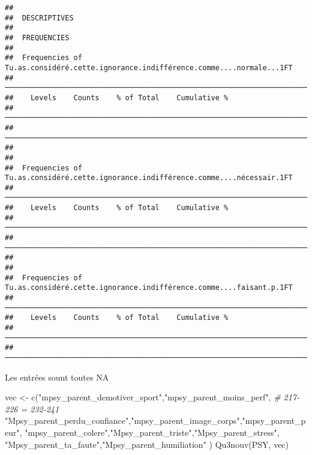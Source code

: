 \documentclass[
]{article}
\newenvironment{Shaded}{\begin{snugshade}}{\end{snugshade}}
\newcommand{\CommentTok}[1]{\textcolor[rgb]{0.56,0.35,0.01}{\textit{#1}}}
\newcommand{\FunctionTok}[1]{\textcolor[rgb]{0.00,0.00,0.00}{#1}}
\newcommand{\NormalTok}[1]{#1}
\newcommand{\OtherTok}[1]{\textcolor[rgb]{0.56,0.35,0.01}{#1}}
\newcommand{\StringTok}[1]{\textcolor[rgb]{0.31,0.60,0.02}{#1}}
\begin{document}
\begin{verbatim}
## 
##  DESCRIPTIVES
## 
##  FREQUENCIES
## 
##  Frequencies of Tu.as.considéré.cette.ignorance.indifférence.comme....normale...1FT 
##  ────────────────────────────────────────────────────────────────────────────────── 
##    Levels    Counts    % of Total    Cumulative %   
##  ────────────────────────────────────────────────────────────────────────────────── 
##  ────────────────────────────────────────────────────────────────────────────────── 
## 
## 
##  Frequencies of Tu.as.considéré.cette.ignorance.indifférence.comme....nécessair.1FT 
##  ────────────────────────────────────────────────────────────────────────────────── 
##    Levels    Counts    % of Total    Cumulative %   
##  ────────────────────────────────────────────────────────────────────────────────── 
##  ────────────────────────────────────────────────────────────────────────────────── 
## 
## 
##  Frequencies of Tu.as.considéré.cette.ignorance.indifférence.comme....faisant.p.1FT 
##  ────────────────────────────────────────────────────────────────────────────────── 
##    Levels    Counts    % of Total    Cumulative %   
##  ────────────────────────────────────────────────────────────────────────────────── 
##  ──────────────────────────────────────────────────────────────────────────────────
\end{verbatim}

Les entrées sount toutes NA

\begin{Shaded}
\begin{Highlighting}[]
\NormalTok{vec }\OtherTok{\textless{}{-}} \FunctionTok{c}\NormalTok{(}\StringTok{"mpsy\_parent\_demotiver\_sport"}\NormalTok{,}\StringTok{"mpsy\_parent\_moins\_perf"}\NormalTok{,         }\CommentTok{\# 217{-}226 = 232{-}241}
  \StringTok{"Mpsy\_parent\_perdu\_confiance"}\NormalTok{,}\StringTok{"mpsy\_parent\_image\_corps"}\NormalTok{,}\StringTok{"mpsy\_parent\_peur"}\NormalTok{, }
    \StringTok{"mpsy\_parent\_colere"}\NormalTok{,}\StringTok{"Mpsy\_parent\_triste"}\NormalTok{,}\StringTok{"Mpsy\_parent\_stress"}\NormalTok{,}
    \StringTok{"Mpsy\_parent\_ta\_faute"}\NormalTok{,}\StringTok{"Mpsy\_parent\_humiliation"}
\NormalTok{     )}
\FunctionTok{Qu3nouv}\NormalTok{(PSY, vec)}
\end{Highlighting}
\end{Shaded}
\end{document}
